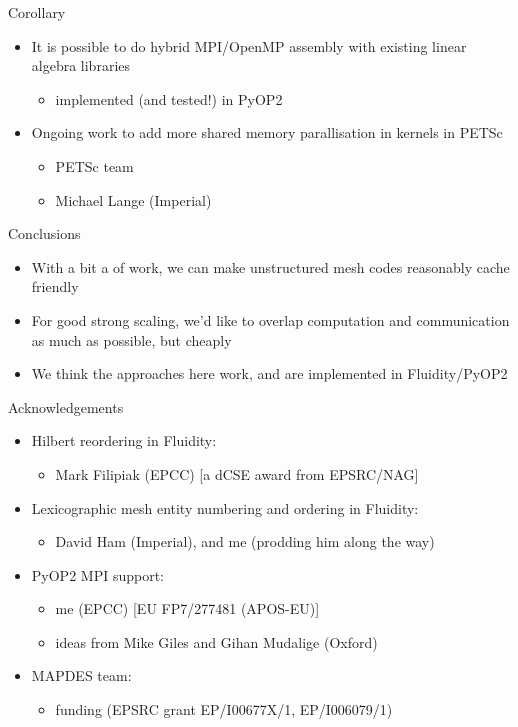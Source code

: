 \documentclass[presentation]{beamer}
\begin{document}
\begin{frame}[label={sec:orgheadline24}]{Corollary}
\begin{itemize}
\item It is possible to do hybrid MPI/OpenMP assembly with existing
linear algebra libraries
\begin{itemize}
\item implemented (and tested!) in PyOP2
\end{itemize}
\item Ongoing work to add more shared memory parallisation in
kernels in PETSc
\begin{itemize}
\item PETSc team
\item Michael Lange (Imperial)
\end{itemize}
\end{itemize}
\end{frame}

\begin{frame}[label={sec:orgheadline25}]{Conclusions}
\begin{itemize}
\item With a bit a of work, we can make unstructured mesh codes
reasonably cache friendly
\item For good strong scaling, we'd like to overlap computation and
communication as much as possible, but cheaply
\item We think the approaches here work, and are implemented in
Fluidity/PyOP2
\end{itemize}
\end{frame}

\begin{frame}[label={sec:orgheadline26}]{Acknowledgements}
\begin{itemize}
\item Hilbert reordering in Fluidity:
\begin{itemize}
\item Mark Filipiak (EPCC) [a dCSE award from EPSRC/NAG]
\end{itemize}
\item Lexicographic mesh entity numbering and ordering in Fluidity:
\begin{itemize}
\item David Ham (Imperial), and me (prodding him along the way)
\end{itemize}
\item PyOP2 MPI support:
\begin{itemize}
\item me (EPCC) [EU FP7/277481 (APOS-EU)]
\item ideas from Mike Giles and Gihan Mudalige (Oxford)
\end{itemize}
\item MAPDES team:
\begin{itemize}
\item funding (EPSRC grant EP/I00677X/1, EP/I006079/1)
\end{itemize}
\end{itemize}
\end{frame}
\end{document}
